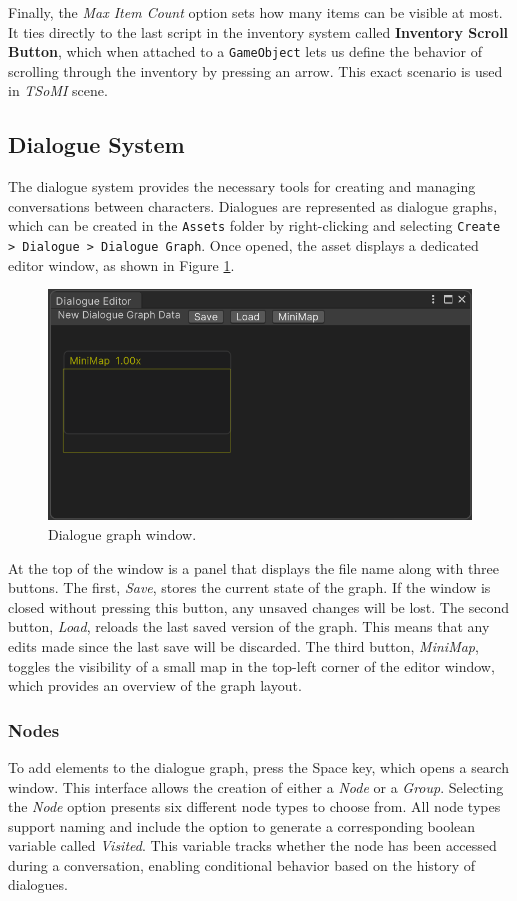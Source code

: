 Finally, the \textit{Max Item Count} option sets how many items can be visible at most. It ties directly to the last script in the inventory system called \textbf{Inventory Scroll Button}, which when attached to a \verb|GameObject| lets us define the behavior of scrolling through the inventory by pressing an arrow. This exact scenario is used in \textit{TSoMI} scene.

\subsection{Dialogue System}
\label{Manual:DS}
The dialogue system provides the necessary tools for creating and managing conversations between characters. Dialogues are represented as dialogue graphs, which can be created in the \verb|Assets| folder by right-clicking and selecting \verb|Create > Dialogue > Dialogue Graph|. Once opened, the asset displays a dedicated editor window, as shown in Figure \ref{fig:Manual-DW}.

\begin{figure}[H]
\centering
\includegraphics[width=0.8\linewidth]{img/User doc/image_2025-07-04_123651622.png}
\caption{Dialogue graph window.}
\label{fig:Manual-DW}
\end{figure}

At the top of the window is a panel that displays the file name along with three buttons. The first, \textit{Save}, stores the current state of the graph. If the window is closed without pressing this button, any unsaved changes will be lost. The second button, \textit{Load}, reloads the last saved version of the graph. This means that any edits made since the last save will be discarded. The third button, \textit{MiniMap}, toggles the visibility of a small map in the top-left corner of the editor window, which provides an overview of the graph layout.

\subsubsection{Nodes}
To add elements to the dialogue graph, press the Space key, which opens a search window. This interface allows the creation of either a \textit{Node} or a \textit{Group}. Selecting the \textit{Node} option presents six different node types to choose from. All node types support naming and include the option to generate a corresponding boolean variable called \textit{Visited}. This variable tracks whether the node has been accessed during a conversation, enabling conditional behavior based on the history of dialogues.

